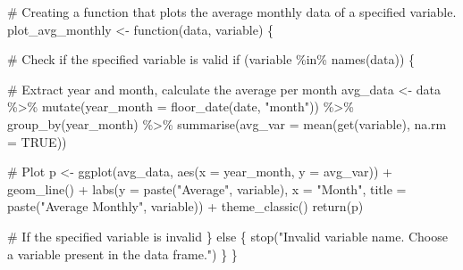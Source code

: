 \documentclass[
  letterpaper,
  DIV=11,
  numbers=noendperiod]{scrartcl}
\newenvironment{Shaded}{\begin{snugshade}}{\end{snugshade}}
\newcommand{\AttributeTok}[1]{\textcolor[rgb]{0.40,0.45,0.13}{#1}}
\newcommand{\CommentTok}[1]{\textcolor[rgb]{0.37,0.37,0.37}{#1}}
\newcommand{\ConstantTok}[1]{\textcolor[rgb]{0.56,0.35,0.01}{#1}}
\newcommand{\ControlFlowTok}[1]{\textcolor[rgb]{0.00,0.23,0.31}{#1}}
\newcommand{\FunctionTok}[1]{\textcolor[rgb]{0.28,0.35,0.67}{#1}}
\newcommand{\NormalTok}[1]{\textcolor[rgb]{0.00,0.23,0.31}{#1}}
\newcommand{\OtherTok}[1]{\textcolor[rgb]{0.00,0.23,0.31}{#1}}
\newcommand{\SpecialCharTok}[1]{\textcolor[rgb]{0.37,0.37,0.37}{#1}}
\newcommand{\StringTok}[1]{\textcolor[rgb]{0.13,0.47,0.30}{#1}}
\begin{document}
\begin{Shaded}
\begin{Highlighting}[]
\CommentTok{\# Creating a function that plots the average monthly data of a specified variable.}
\NormalTok{plot\_avg\_monthly }\OtherTok{\textless{}{-}} \ControlFlowTok{function}\NormalTok{(data, variable) \{}
  
  \CommentTok{\# Check if the specified variable is valid}
  \ControlFlowTok{if}\NormalTok{ (variable }\SpecialCharTok{\%in\%} \FunctionTok{names}\NormalTok{(data)) \{}
    
    \CommentTok{\# Extract year and month, calculate the average per month}
\NormalTok{    avg\_data }\OtherTok{\textless{}{-}}\NormalTok{ data }\SpecialCharTok{\%\textgreater{}\%}
      \FunctionTok{mutate}\NormalTok{(}\AttributeTok{year\_month =} \FunctionTok{floor\_date}\NormalTok{(date, }\StringTok{"month"}\NormalTok{)) }\SpecialCharTok{\%\textgreater{}\%}
      \FunctionTok{group\_by}\NormalTok{(year\_month) }\SpecialCharTok{\%\textgreater{}\%}
      \FunctionTok{summarise}\NormalTok{(}\AttributeTok{avg\_var =} \FunctionTok{mean}\NormalTok{(}\FunctionTok{get}\NormalTok{(variable), }\AttributeTok{na.rm =} \ConstantTok{TRUE}\NormalTok{))}
    
    \CommentTok{\# Plot}
\NormalTok{    p }\OtherTok{\textless{}{-}} \FunctionTok{ggplot}\NormalTok{(avg\_data, }\FunctionTok{aes}\NormalTok{(}\AttributeTok{x =}\NormalTok{ year\_month, }\AttributeTok{y =}\NormalTok{ avg\_var)) }\SpecialCharTok{+}
      \FunctionTok{geom\_line}\NormalTok{() }\SpecialCharTok{+}
      \FunctionTok{labs}\NormalTok{(}\AttributeTok{y =} \FunctionTok{paste}\NormalTok{(}\StringTok{"Average"}\NormalTok{, variable),}
           \AttributeTok{x =} \StringTok{"Month"}\NormalTok{,}
           \AttributeTok{title =} \FunctionTok{paste}\NormalTok{(}\StringTok{"Average Monthly"}\NormalTok{, variable)) }\SpecialCharTok{+}
      \FunctionTok{theme\_classic}\NormalTok{()}
    \FunctionTok{return}\NormalTok{(p)}
    
  \CommentTok{\# If the specified variable is invalid  }
\NormalTok{  \} }\ControlFlowTok{else}\NormalTok{ \{}
    \FunctionTok{stop}\NormalTok{(}\StringTok{"Invalid variable name. Choose a variable present in the data frame."}\NormalTok{)}
\NormalTok{  \}}
\NormalTok{\}}
\end{Highlighting}
\end{Shaded}
\end{document}
